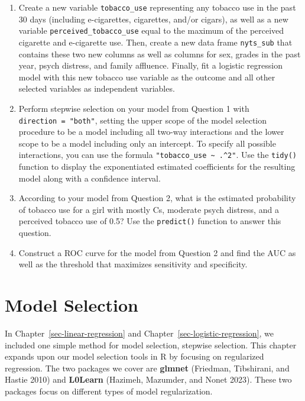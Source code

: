 \documentclass[
  letterpaper,
]{latex/krantz}
\begin{document}
\begin{enumerate}
\def\labelenumi{\arabic{enumi}.}
\item
  Create a new variable \texttt{tobacco\_use} representing any tobacco
  use in the past 30 days (including e-cigarettes, cigarettes, and/or
  cigars), as well as a new variable \texttt{perceived\_tobacco\_use}
  equal to the maximum of the perceived cigarette and e-cigarette use.
  Then, create a new data frame \texttt{nyts\_sub} that contains these
  two new columns as well as columns for sex, grades in the past year,
  psych distress, and family affluence. Finally, fit a logistic
  regression model with this new tobacco use variable as the outcome and
  all other selected variables as independent variables.
\item
  Perform stepwise selection on your model from Question 1 with
  \texttt{direction\ =\ "both"}, setting the upper scope of the model
  selection procedure to be a model including all two-way interactions
  and the lower scope to be a model including only an intercept. To
  specify all possible interactions, you can use the formula
  \texttt{"tobacco\_use\ \textasciitilde{}\ .\^{}2"}. Use the
  \texttt{tidy()} function to display the exponentiated estimated
  coefficients for the resulting model along with a confidence interval.
\item
  According to your model from Question 2, what is the estimated
  probability of tobacco use for a girl with mostly Cs, moderate psych
  distress, and a perceived tobacco use of 0.5? Use the
  \texttt{predict()} function to answer this question.
\item
  Construct a ROC curve for the model from Question 2 and find the AUC
  as well as the threshold that maximizes sensitivity and specificity.
\end{enumerate}

\chapter{Model Selection}\label{sec-model-selection}

In Chapter~\ref{sec-linear-regression} and
Chapter~\ref{sec-logistic-regression}, we included one simple method for
model selection, stepwise selection. This chapter expands upon our model
selection tools in R by focusing on regularized
regression. The two packages we cover are
\textbf{glmnet} (Friedman, Tibshirani, and Hastie 2010)
 and \textbf{L0Learn} (Hazimeh, Mazumder, and
Nonet 2023). These two packages focus on
different types of model regularization.
\end{document}
